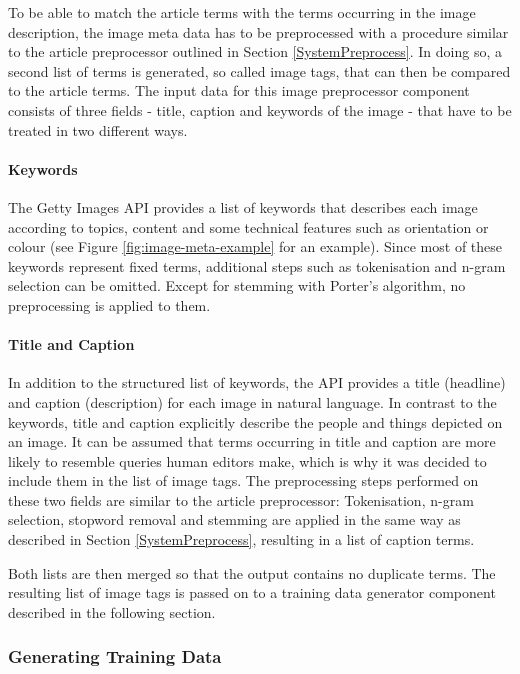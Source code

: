 \documentclass[11pt,a4paper,twoside]{article}
\begin{document}
\noindent To be able to match the article terms with the terms occurring in the image description, the image meta data has to be preprocessed with a procedure similar to the article preprocessor outlined in Section \ref{SystemPreprocess}. In doing so, a second list of terms is generated, so called image tags, that can then be compared to the article terms. The input data for this image preprocessor component consists of three fields - title, caption and keywords of the image - that have to be treated in two different ways.

\paragraph{Keywords} The Getty Images API provides a list of keywords that describes each image according to topics, content and some technical features such as orientation or colour (see Figure \ref{fig:image-meta-example} for an example). Since most of these keywords represent fixed terms, additional steps such as tokenisation and n-gram selection can be omitted. Except for stemming with Porter's algorithm, no preprocessing is applied to them.

\paragraph{Title and Caption} In addition to the structured list of keywords, the API provides a title (headline) and caption (description) for each image in natural language. In contrast to the keywords, title and caption explicitly describe the people and things depicted on an image. It can be assumed that terms occurring in title and caption are more likely to resemble queries human editors make, which is why it was decided to include them in the list of image tags. The preprocessing steps performed on these two fields are similar to the article preprocessor: Tokenisation, n-gram selection, stopword removal and stemming are applied in the same way as described in Section \ref{SystemPreprocess}, resulting in a list of caption terms.

Both lists are then merged so that the output contains no duplicate terms. The resulting list of image tags is passed on to a training data generator component described in the following section.

\subsubsection{Generating Training Data} \label{SystemTrainGenerate}
\end{document}
